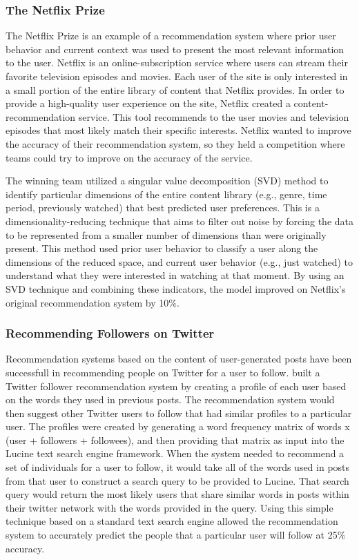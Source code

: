 \documentclass[man,floatsintext]{apa6}
\begin{document}
\subsubsection{The Netflix Prize}

The Netflix Prize \parencite{Bennett2007} is an example of a recommendation system where prior user behavior and current context was used to present the most relevant information to the user.
Netflix is an online-subscription service where users can stream their favorite television episodes and movies.
Each user of the site is only interested in a small portion of the entire library of content that Netflix provides.
In order to provide a high-quality user experience on the site, Netflix created a content-recommendation service.
This tool recommends to the user movies and television episodes that most likely match their specific interests.
Netflix wanted to improve the accuracy of their recommendation system, so they held a competition where teams could try to improve on the accuracy of the service.

The winning team utilized a singular value decomposition (SVD) method to identify particular dimensions of the entire content library (e.g., genre, time period, previously watched) that best predicted user preferences.
This is a dimensionality-reducing technique that aims to filter out noise by forcing the data to be represented from a smaller number of dimensions than were originally present.
This method used prior user behavior to classify a user along the dimensions of the reduced space, and current user behavior (e.g., just watched) to understand what they were interested in watching at that moment.
By using an SVD technique and combining these indicators, the model improved on Netflix's original recommendation system by 10\%.

\subsubsection{Recommending Followers on Twitter}

Recommendation systems based on the content of user-generated posts have been successfull in recommending people on Twitter for a user to follow.
\textcite{Hannon2010} built a Twitter follower recommendation system by creating a profile of each user based on the words they used in previous posts.
The recommendation system would then suggest other Twitter users to follow that had similar profiles to a particular user.
The profiles were created by generating a word frequency matrix of words x (user + followers + followees), and then providing that matrix as input into the Lucine text search engine framework.
When the system needed to recommend a set of individuals for a user to follow, it would take all of the words used in posts from that user to construct a search query to be provided to Lucine.
That search query would return the most likely users that share similar words in posts within their twitter network with the words provided in the query.
Using this simple technique based on a standard text search engine allowed the recommendation system to accurately predict the people that a particular user will follow at 25\% accuracy.
\end{document}
